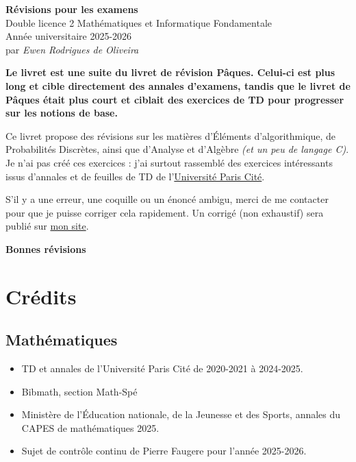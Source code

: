 \documentclass{article}
\begin{document}
\thispagestyle{empty}

\newcommand{\doctitle}{Révisions pour les examens}

\vspace*{\fill}

\begin{center}
    {\LARGE\textbf{\doctitle}}\\[0.6em]
    {\Large Double licence 2 Mathématiques et Informatique  Fondamentale}\\[2em]
    {\large Année universitaire 2025-2026}\\[0.25em]
    {\large par \textit{Ewen Rodrigues de Oliveira}}
\end{center}

\vfill

\noindent
\textbf{Le livret est une suite du livret de révision Pâques. Celui-ci est plus long et cible directement des annales d'examens, tandis que le livret de Pâques était plus court et ciblait des exercices de TD pour progresser sur les notions de base.}
\medskip

\noindent
Ce livret propose des révisions sur les matières d'Éléments d'algorithmique, de Probabilités Discrètes, ainsi que d'Analyse et d'Algèbre \textit{(et un peu de langage C)}. Je n'ai pas créé ces exercices : j'ai surtout rassemblé des exercices intéressants issus d'annales et de feuilles de TD de l'\href{https://u-pariscite.fr/}{Université Paris Cité}.

\medskip

\noindent
S'il y a une erreur, une coquille ou un énoncé ambigu, merci de me contacter pour que je puisse corriger cela rapidement. Un corrigé (non exhaustif) sera publié sur \href{https://ewenrdo.fr/ressources/}{mon site}.

\begin{flushright}
\textbf{Bonnes révisions \faSmile}
\end{flushright}

\newpage

\section*{Crédits}
\subsection*{Mathématiques}
\begin{itemize}
\item TD et annales de l'Université Paris Cité de 2020-2021 à 2024-2025.
\item Bibmath, section Math-Spé
\item Ministère de l'Éducation nationale, de la Jeunesse et des Sports, annales du CAPES de mathématiques 2025.
\item Sujet de contrôle continu de Pierre Faugere pour l'année 2025-2026.
\end{itemize}
\end{document}
